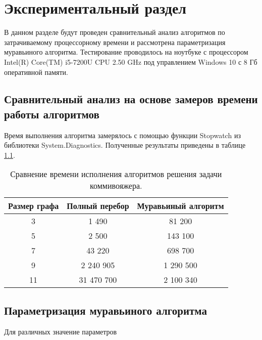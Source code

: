 \chapter{Экспериментальный раздел}
\label{cha:research}
    В данном разделе будут проведен  
    сравнительный анализ алгоритмов по затрачиваемому процессорному 
    времени и рассмотрена параметризация муравьиного алгоритма.
    Тестирование проводилось на ноутбуке с процессором
    Intel(R) Core(TM) i5-7200U CPU 2.50 GHz \cite{processor-i5-7200u}
    под управлением Windows 10 с 8 Гб оперативной памяти.

    \section{Сравнительный анализ на основе замеров времени работы алгоритмов}
        Время выполнения алгоритма замерялось с помощью функции Stopwatch \cite{csharp-stopwatch}
        из библиотеки System.Diagnostics. Полученные результаты приведены в таблице \ref{table:test:time}.
        
        \begin{table}[h!]
            \begin{center}
                \begin{tabular}{|c|c|c|}
                    \hline
                    Размер графа & Полный перебор & Муравьиный алгоритм \\ \hline
                    3  & 1 490 & 81 200 \\ \hline
                    5  & 2 500 & 143 100 \\ \hline
                    7  & 43 220 & 698 700 \\ \hline
                    9  & 2 240 905 & 1 290 500 \\ \hline
                    11 & 31 470 700 & 2 100 340 \\
                    \hline
                \end{tabular}
            \end{center}
            \caption{Сравнение времени исполнения алгоритмов решения задачи коммивояжера.}
            \label{table:test:time}
        \end{table}



    \section{Параметризация муравьиного алгоритма}
        Для различных значение параметров

